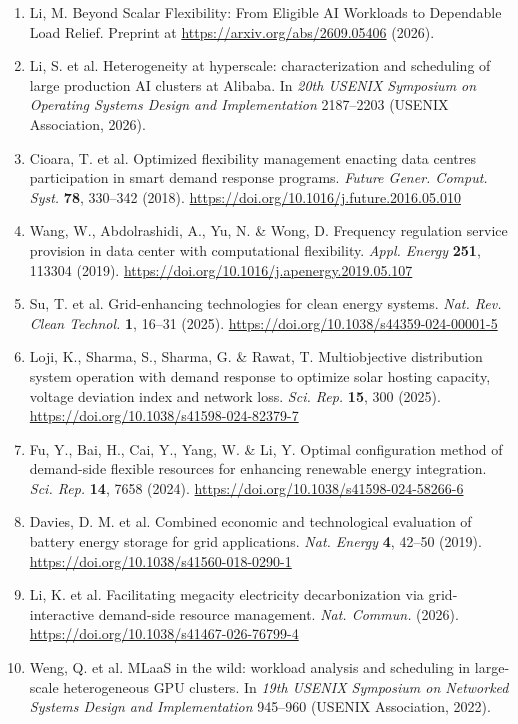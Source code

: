 \documentclass[10pt,a4paper]{article}
\begin{document}
{\begin{enumerate}[label=\arabic*.,leftmargin=*,itemsep=2.5pt]
\item Li, M. Beyond Scalar Flexibility: From Eligible AI Workloads to Dependable Load Relief. Preprint at \url{https://arxiv.org/abs/2609.05406} (2026).
\item Li, S. et al. Heterogeneity at hyperscale: characterization and scheduling of large production AI clusters at Alibaba. In \emph{20th USENIX Symposium on Operating Systems Design and Implementation} 2187–2203 (USENIX Association, 2026).
\item Cioara, T. et al. Optimized flexibility management enacting data centres participation in smart demand response programs. \emph{Future Gener. Comput. Syst.} \textbf{78}, 330–342 (2018). \url{https://doi.org/10.1016/j.future.2016.05.010}
\item Wang, W., Abdolrashidi, A., Yu, N. \& Wong, D. Frequency regulation service provision in data center with computational flexibility. \emph{Appl. Energy} \textbf{251}, 113304 (2019). \url{https://doi.org/10.1016/j.apenergy.2019.05.107}
\item Su, T. et al. Grid-enhancing technologies for clean energy systems. \emph{Nat. Rev. Clean Technol.} \textbf{1}, 16–31 (2025). \url{https://doi.org/10.1038/s44359-024-00001-5}
\item Loji, K., Sharma, S., Sharma, G. \& Rawat, T. Multiobjective distribution system operation with demand response to optimize solar hosting capacity, voltage deviation index and network loss. \emph{Sci. Rep.} \textbf{15}, 300 (2025). \url{https://doi.org/10.1038/s41598-024-82379-7}
\item Fu, Y., Bai, H., Cai, Y., Yang, W. \& Li, Y. Optimal configuration method of demand-side flexible resources for enhancing renewable energy integration. \emph{Sci. Rep.} \textbf{14}, 7658 (2024). \url{https://doi.org/10.1038/s41598-024-58266-6}
\item Davies, D. M. et al. Combined economic and technological evaluation of battery energy storage for grid applications. \emph{Nat. Energy} \textbf{4}, 42–50 (2019). \url{https://doi.org/10.1038/s41560-018-0290-1}
\item Li, K. et al. Facilitating megacity electricity decarbonization via grid-interactive demand-side resource management. \emph{Nat. Commun.} (2026). \url{https://doi.org/10.1038/s41467-026-76799-4}
\item Weng, Q. et al. MLaaS in the wild: workload analysis and scheduling in large-scale heterogeneous GPU clusters. In \emph{19th USENIX Symposium on Networked Systems Design and Implementation} 945–960 (USENIX Association, 2022).

\end{enumerate}}
\end{document}
